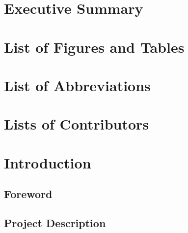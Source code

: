\documentclass[
  11pt,
]{article}
\begin{document}
\clearpage

\setcounter{tocdepth}{2}
\tableofcontents

\clearpage

\hypertarget{executive-summary}{%
\section*{Executive Summary}\label{executive-summary}}

\clearpage

\hypertarget{list-of-figures-and-tables}{%
\section*{List of Figures and Tables}\label{list-of-figures-and-tables}}

\clearpage

\hypertarget{list-of-abbreviations}{%
\section*{List of Abbreviations}\label{list-of-abbreviations}}

\clearpage

\hypertarget{lists-of-contributors}{%
\section*{Lists of Contributors}\label{lists-of-contributors}}


\clearpage

\hypertarget{introduction}{%
\section{Introduction}\label{introduction}}

\hypertarget{foreword}{%
\subsection{Foreword}\label{foreword}}

\hypertarget{project-description}{%
\subsection{Project Description}\label{project-description}}
\end{document}
